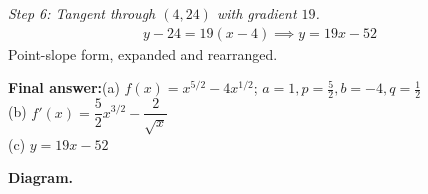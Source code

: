 \documentclass[11pt]{article}
\begin{document}
\textit{Step 6: Tangent through \( (4, 24) \) with gradient \( 19 \).}
\[\begin{gathered}
y - 24 = 19(x - 4) \implies y = 19x - 52
\end{gathered}\]
Point-slope form, expanded and rearranged.

\begin{answerbox}
\textbf{Final answer:}\quad (a) \(\displaystyle  f(x) = x^{5/2} - 4x^{1/2} \); \(\displaystyle  a=1, p=\tfrac{5}{2}, b=-4, q=\tfrac{1}{2} \) \\[3pt]  (b) \(\displaystyle  f'(x) = \dfrac{5}{2}x^{3/2} - \dfrac{2}{\sqrt{x}} \) \\[3pt]  (c) \(\displaystyle  y = 19x - 52 \)
\end{answerbox}
\textbf{Diagram.}

\begin{center}
\end{center}
\end{document}
